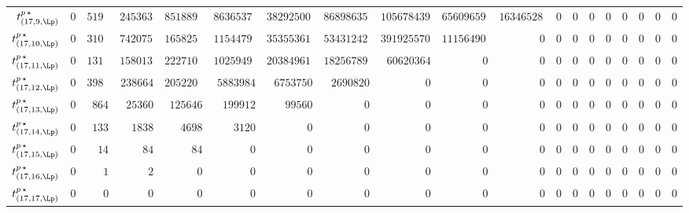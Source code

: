 \begin{tabular}{r|rrrrrrrrrrrrrrrrrr}
  $t^{p \, \star}_{(17,9,\Lp)}$ & $0$ & $51901$ & $24536334$ & $851889552$ & $8636537720$ & $38292500035$ & $86898635910$ & $105678439286$ & $65609659200$ & $16346528928$ & $0$ & $0$ & $0$ & $0$ & $0$ & $0$ & $0$ & $0$ \\
  $t^{p \, \star}_{(17,10,\Lp)}$ & $0$ & $31061$ & $7420750$ & $165825324$ & $1154479432$ & $3535536170$ & $5343124284$ & $3919255704$ & $1115649024$ & $0$ & $0$ & $0$ & $0$ & $0$ & $0$ & $0$ & $0$ & $0$ \\
  $t^{p \, \star}_{(17,11,\Lp)}$ & $0$ & $13138$ & $1580132$ & $22271004$ & $102594928$ & $203849610$ & $182567892$ & $60620364$ & $0$ & $0$ & $0$ & $0$ & $0$ & $0$ & $0$ & $0$ & $0$ & $0$ \\
  $t^{p \, \star}_{(17,12,\Lp)}$ & $0$ & $3980$ & $238664$ & $2052204$ & $5883984$ & $6753750$ & $2690820$ & $0$ & $0$ & $0$ & $0$ & $0$ & $0$ & $0$ & $0$ & $0$ & $0$ & $0$ \\
  $t^{p \, \star}_{(17,13,\Lp)}$ & $0$ & $864$ & $25360$ & $125646$ & $199912$ & $99560$ & $0$ & $0$ & $0$ & $0$ & $0$ & $0$ & $0$ & $0$ & $0$ & $0$ & $0$ & $0$ \\
  $t^{p \, \star}_{(17,14,\Lp)}$ & $0$ & $133$ & $1838$ & $4698$ & $3120$ & $0$ & $0$ & $0$ & $0$ & $0$ & $0$ & $0$ & $0$ & $0$ & $0$ & $0$ & $0$ & $0$ \\
  $t^{p \, \star}_{(17,15,\Lp)}$ & $0$ & $14$ & $84$ & $84$ & $0$ & $0$ & $0$ & $0$ & $0$ & $0$ & $0$ & $0$ & $0$ & $0$ & $0$ & $0$ & $0$ & $0$ \\
  $t^{p \, \star}_{(17,16,\Lp)}$ & $0$ & $1$ & $2$ & $0$ & $0$ & $0$ & $0$ & $0$ & $0$ & $0$ & $0$ & $0$ & $0$ & $0$ & $0$ & $0$ & $0$ & $0$ \\
  $t^{p \, \star}_{(17,17,\Lp)}$ & $0$ & $0$ & $0$ & $0$ & $0$ & $0$ & $0$ & $0$ & $0$ & $0$ & $0$ & $0$ & $0$ & $0$ & $0$ & $0$ & $0$ & $0$ \\
\end{tabular}
